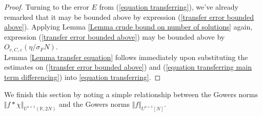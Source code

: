 \documentclass[12pt,a4paper,twoside,reqno]{amsart}
\numberwithin{equation}{section}
\begin{document}
\begin{proof}
 
Turning to the error $E$ from (\ref{equation transferring}), we've already remarked that it may be bounded above by expression (\ref{transfer error bounded above}). Applying Lemma \ref{Lemma crude bound on number of solutions} again, expression (\ref{transfer error bounded above}) may be bounded above by $O_{c,C,\varepsilon}(\eta/\sigma_F N)$. \\

Lemma \ref{Lemma transfer equation} follows immediately upon substituting the estimates on (\ref{transfer error bounded above}) and (\ref{equation transferring main term differencing}) into \eqref{equation transferring}.
\end{proof}

We finish this section by noting a simple relationship between the Gowers norms $\Vert f\ast \chi \Vert_{U^{s+1}(\mathbb{R},2N)}$ and the Gowers norms $\Vert f \Vert_{U^{s+1}[N]}$. 
\end{document}
